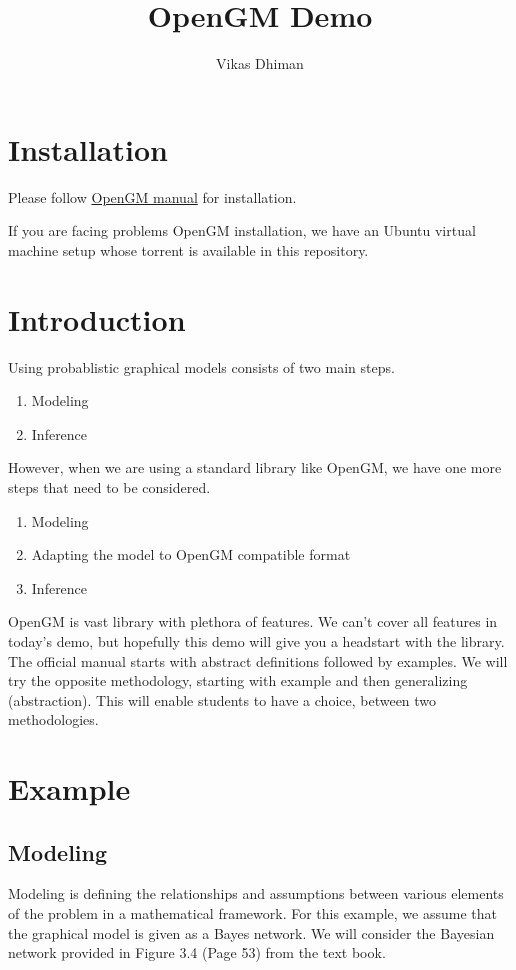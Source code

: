 \documentclass[12pt,oneside,letterpaper]{article}
\title{OpenGM Demo}
\author{Vikas Dhiman}
\begin{document}
\maketitle
\section{Installation}
Please follow \href{http://www.andres.sc/publications/opengm-2.0.2-beta-manual.pdf}{OpenGM manual} for installation.

If you are facing problems OpenGM installation, we have an Ubuntu virtual
machine setup whose torrent is available in this repository.

\section{Introduction}
Using probablistic graphical models consists of two main steps. 
\begin{enumerate}
  \item Modeling
  \item Inference
\end{enumerate}

However, when we are using a standard library like OpenGM, we have one more
steps that need to be considered.
\begin{enumerate}
  \item Modeling
  \item Adapting the model to OpenGM compatible format
  \item Inference
\end{enumerate}

OpenGM is vast library with plethora of features. We can't cover all features
in today's demo, but hopefully this demo will give you a headstart with the
library. The official manual starts with abstract definitions followed by
examples. We will try the opposite methodology, starting with example and then
generalizing (abstraction). This will enable students to have a choice, between two methodologies.

\section{Example}
\subsection{Modeling}
Modeling is defining the relationships and assumptions between various elements
of the problem in a mathematical framework. For this example, we assume that
the graphical model is given as a Bayes network.  We will consider the Bayesian
network provided in Figure 3.4 (Page 53) from the text book.
\end{document}
